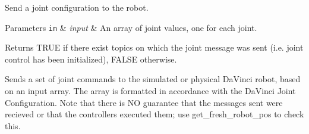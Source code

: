 Send a joint configuration to the robot. 


\begin{DoxyParams}[1]{Parameters}
\mbox{\tt in}  & {\em input} & An array of joint values, one for each joint.\\
\hline
\end{DoxyParams}
\begin{DoxyReturn}{Returns}
T\-R\-U\-E if there exist topics on which the joint message was sent (i.\-e. joint control has been initialized), F\-A\-L\-S\-E otherwise.
\end{DoxyReturn}
Sends a set of joint commands to the simulated or physical Da\-Vinci robot, based on an input array. The array is formatted in accordance with the Da\-Vinci Joint Configuration. Note that there is N\-O guarantee that the messages sent were recieved or that the controllers executed them; use get\-\_\-fresh\-\_\-robot\-\_\-pos to check this. 